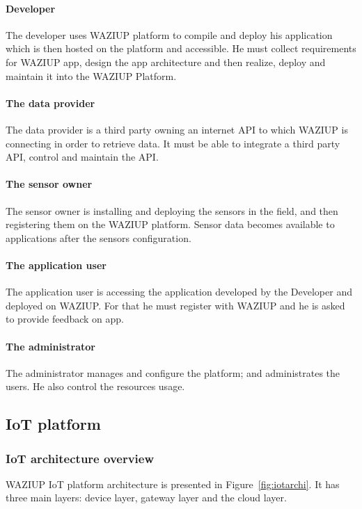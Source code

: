 \paragraph{Developer}
The developer uses WAZIUP platform to compile and deploy his application which is then hosted on the platform and accessible. He must collect requirements for WAZIUP app, design the app architecture and then realize, deploy and maintain it into the WAZIUP Platform. 

\paragraph{The data provider}
The data provider is a third party owning an internet API to which WAZIUP is connecting in order to retrieve data. It must be able to integrate a third party API, control and maintain the API. 

\paragraph{The sensor owner }
The sensor owner is installing and deploying the sensors in the field, and then registering them on the WAZIUP platform. Sensor data becomes available to applications after the sensors configuration.

\paragraph{The application user}
The application user is accessing the application developed by the Developer and deployed on WAZIUP. For that he must register with WAZIUP and he is asked to provide feedback on app. 

\paragraph{The administrator}
The administrator manages and configure the platform; and administrates the users. He also control the resources usage. 

\subsection{IoT platform}

\subsubsection{IoT architecture overview}

WAZIUP IoT platform architecture is presented in Figure~\ref{fig:iotarchi}.
It has three main layers: device layer, gateway layer and the cloud layer.

